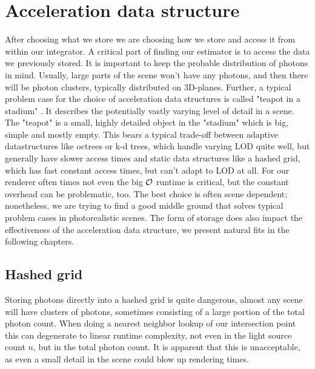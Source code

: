 \section{Acceleration data structure}
\label{ch:AccelDat}

After choosing what we store we are choosing how we store and access it from within our integrator. A critical part of finding our estimator is to access the data we previously stored. It is important to keep the probable distribution of photons in mind. Usually, large parts of the scene won't have any photons, and then there will be photon clusters, typically distributed on 3D-planes. Further, a typical problem case for the choice of acceleration data structures is called "teapot in a stadium" . It describes the potentially vastly varying level of detail in a scene. The "teapot" is a small, highly detailed object in the "stadium" which is big, simple and mostly empty. This bears a typical trade-off between adaptive datastructures like octrees or k-d trees, which handle varying LOD quite well, but generally have slower access times and static data structures like a hashed grid, which has fast constant access times, but can't adapt to LOD at all. For our renderer often times not even the big $\mathcal{O}$ runtime is critical, but the constant overhead can be problematic, too. The best choice is often scene dependent; nonetheless, we are trying to find a good middle ground that solves typical problem cases in photorealistic scenes. The form of storage does also impact the effectiveness of the acceleration data structure, we present natural fits in the following chapters.

\subsection{Hashed grid}
\label{ch:pnee:hashedgrid}
Storing photons directly into a hashed grid is quite dangerous, almost any scene will have clusters of photons, sometimes consisting of a large portion of the total photon count. When doing a nearest neighbor lookup of our intersection point this can degenerate to linear runtime complexity, not even in the light source count $n$, but in the total photon count. It is apparent that this is unacceptable, as even a small detail in the scene could blow up rendering times.

